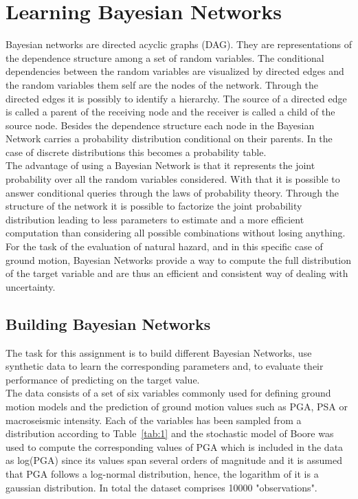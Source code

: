 
\chapter{Learning Bayesian Networks} %

\label{Chapter2} %

Bayesian networks are directed acyclic graphs (DAG). They are representations of the dependence structure among a set of random variables. The conditional dependencies between the random variables are visualized by directed edges and the random variables them self are the nodes of the network. Through the directed edges it is possibly to identify a hierarchy. The source of a directed edge is called a parent of the receiving node and the receiver is called a child of the source node. Besides the dependence structure each node in the Bayesian Network carries a probability distribution conditional on their parents. In the case of discrete distributions this becomes a probability table.\\
The advantage of using a Bayesian Network is that it represents the joint probability over all the random variables considered. With that it is possible to answer conditional queries through the laws of probability theory. Through the structure of the network it is possible to factorize the joint probability distribution leading to less parameters to estimate and a more efficient computation than considering all possible combinations without losing anything. For the task of the evaluation of natural hazard, and in this specific case of ground motion, Bayesian Networks provide a way to compute the full distribution of the target variable and are thus an efficient and consistent way of dealing with uncertainty. 


\section{Building Bayesian Networks}
The task for this assignment is to build different Bayesian Networks, use synthetic data to learn the corresponding parameters and, to evaluate their performance of predicting on the target value.\\
The data consists of a set of six variables commonly used for defining ground motion models and the prediction of ground motion values such as PGA, PSA or macroseismic intensity. Each of the variables has been sampled from a distribution according to Table~\ref{tab:1} and the stochastic model of Boore     \citep{boore2003} was used to compute the corresponding values of PGA which is included in the data as log(PGA) since its values span several orders of magnitude and it is assumed that PGA follows a log-normal distribution, hence, the logarithm of it is a gaussian distribution. In total the dataset comprises 10000 "observations".
\vspace{1.5cm}


